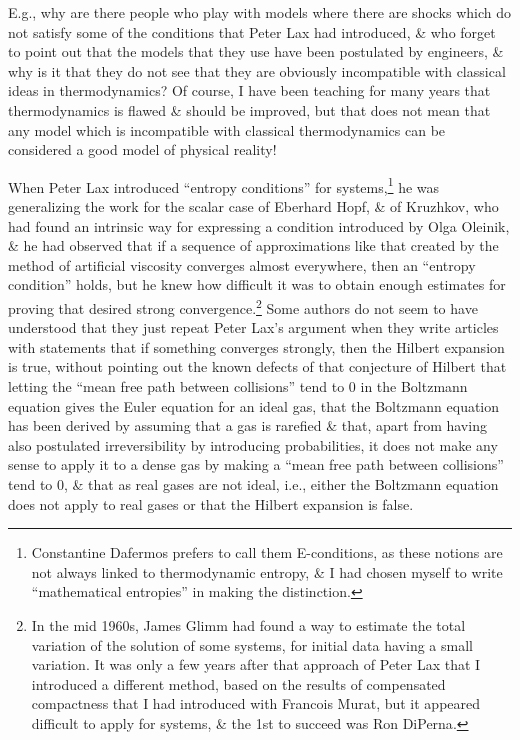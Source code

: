 \documentclass{article}
\begin{document}
\begin{enumerate}
	E.g., why are there people who play with models where there are shocks which do not satisfy some of the conditions that {\sc Peter Lax} had introduced, \& who forget to point out that the models that they use have been postulated by engineers, \& why is it that they do not see that they are obviously incompatible with classical ideas in thermodynamics? Of course, I have been teaching for many years that thermodynamics is flawed \& should be improved, but that does not mean that any model which is incompatible with classical thermodynamics can be considered a good model of physical reality!
	
	When {\sc Peter Lax} introduced ``entropy conditions'' for systems,\footnote{{\sc Constantine Dafermos} prefers to call them E-conditions, as these notions are not always linked to thermodynamic entropy, \& I had chosen myself to write ``mathematical entropies'' in making the distinction.} he was generalizing the work for the scalar case of {\sc Eberhard Hopf}, \& of {\sc Kruzhkov}, who had found an intrinsic way for expressing a condition introduced by {\sc Olga Oleinik}, \& he had observed that if a sequence of approximations like that created by the method of artificial viscosity converges almost everywhere, then an ``entropy condition'' holds, but he knew how difficult it was to obtain enough estimates for proving that desired strong convergence.\footnote{In the mid 1960s, {\sc James Glimm} had found a way to estimate the total variation of the solution of some systems, for initial data having a small variation. It was only a few years after that approach of {\sc Peter Lax} that I introduced a different method, based on the results of compensated compactness that I had introduced with {\sc Francois Murat}, but it appeared difficult to apply for systems, \& the 1st to succeed was {\sc Ron DiPerna}.} Some authors do not seem to have understood that they just repeat {\sc Peter Lax}'s argument when they write articles with statements that if something converges strongly, then the Hilbert expansion is true, without pointing out the known defects of that conjecture of {\sc Hilbert} that letting the ``mean free path between collisions'' tend to 0 in the Boltzmann equation gives the Euler equation for an ideal gas, that the Boltzmann equation has been derived by assuming that a gas is rarefied \& that, apart from having also postulated irreversibility by introducing probabilities, it does not make any sense to apply it to a dense gas by making a ``mean free path between collisions'' tend to 0, \& that as real gases are not ideal, i.e., either the Boltzmann equation does not apply to real gases or that the Hilbert expansion is false.
	

\end{enumerate}
\end{document}
